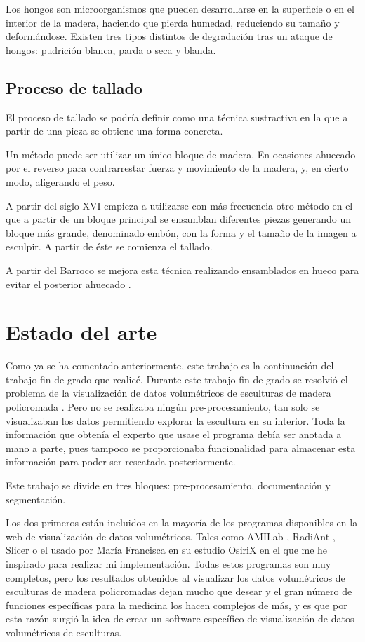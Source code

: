 Los hongos son microorganismos que pueden desarrollarse en la superficie o en el interior de la madera, haciendo que pierda humedad, reduciendo su tamaño y deformándose. Existen tres tipos distintos de degradación tras un ataque de hongos: pudrición blanca, parda o seca y blanda.

\subsection{Proceso de tallado}

El proceso de tallado se podría definir como una técnica sustractiva en la que a partir de una pieza se obtiene una forma concreta.

Un método puede ser utilizar un único bloque de madera. En ocasiones ahuecado por el reverso para contrarrestar fuerza y movimiento de la madera, y, en cierto modo, aligerando el peso.

A partir del siglo XVI empieza a utilizarse con más frecuencia otro método en el que a partir de un bloque principal se ensamblan diferentes piezas generando un bloque más grande, denominado embón, con la forma y el tamaño de la imagen a esculpir. A partir de éste se comienza el tallado.

A partir del Barroco se mejora esta técnica realizando ensamblados en hueco para evitar el posterior ahuecado \cite{sarrio16}.

\section{Estado del arte}

Como ya se ha comentado anteriormente, este trabajo es la continuación del trabajo fin de grado que realicé. Durante este trabajo fin de grado se resolvió el problema de la visualización de datos volumétricos de esculturas de madera policromada \cite{bolivar16}. Pero no se realizaba ningún pre-procesamiento, tan solo se visualizaban los datos permitiendo explorar la escultura en su interior. Toda la información que obtenía el experto que usase el programa debía ser anotada a mano a parte, pues tampoco se proporcionaba funcionalidad para almacenar esta información para poder ser rescatada posteriormente.

Este trabajo se divide en tres bloques: pre-procesamiento, documentación y segmentación. 

Los dos primeros están incluidos en la mayoría de los programas disponibles en la web de visualización de datos volumétricos. Tales como AMILab \cite{krissian12}, RadiAnt \cite{radiant}, Slicer \cite{fedorov12} o el usado por María Francisca en su estudio \cite{sarrio16} OsiriX \cite{rosset04} en el que me he inspirado para realizar mi implementación. Todas estos programas son muy completos, pero los resultados obtenidos al visualizar los datos volumétricos de esculturas de madera policromadas dejan mucho que desear y el gran número de funciones específicas para la medicina los hacen complejos de más, y es que por esta razón surgió la idea de crear un software específico de visualización de datos volumétricos de esculturas.

